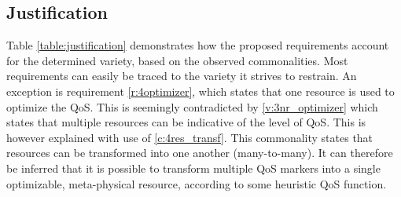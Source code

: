 \subsection{Justification}
Table \ref{table:justification} demonstrates how the proposed requirements account for the determined variety, based on the observed commonalities. Most requirements can easily be traced  to the variety it strives to restrain. An exception is requirement \ref{r:4optimizer}, which states that one resource is used to optimize the QoS. This is seemingly contradicted by \ref{v:3nr_optimizer} which states that multiple resources can be indicative of the level of QoS. This is however explained with use of \ref{c:4res_transf}. This commonality states that resources can be transformed into one another (many-to-many). It can therefore be inferred that it is possible to transform multiple QoS markers into a single optimizable, meta-physical resource, according to some heuristic QoS function.

